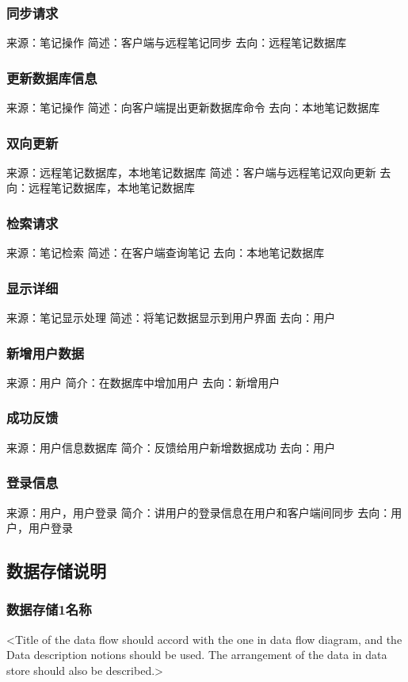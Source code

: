 \subsubsection{同步请求}
来源：笔记操作
简述：客户端与远程笔记同步
去向：远程笔记数据库

\subsubsection{更新数据库信息}
来源：笔记操作
简述：向客户端提出更新数据库命令
去向：本地笔记数据库

\subsubsection{双向更新}
来源：远程笔记数据库，本地笔记数据库
简述：客户端与远程笔记双向更新
去向：远程笔记数据库，本地笔记数据库

\subsubsection{检索请求}
来源：笔记检索
简述：在客户端查询笔记
去向：本地笔记数据库

\subsubsection{显示详细}
来源：笔记显示处理
简述：将笔记数据显示到用户界面
去向：用户

\subsubsection{新增用户数据}
来源：用户
简介：在数据库中增加用户
去向：新增用户

\subsubsection{成功反馈}
来源：用户信息数据库
简介：反馈给用户新增数据成功
去向：用户

\subsubsection{登录信息}
来源：用户，用户登录
简介：讲用户的登录信息在用户和客户端间同步
去向：用户，用户登录


\subsection{数据存储说明}
\subsubsection{数据存储1名称}
<Title of  the data flow should accord with the one in data flow diagram, and the Data description notions should be used. The arrangement of the data in data store should also be described.>

